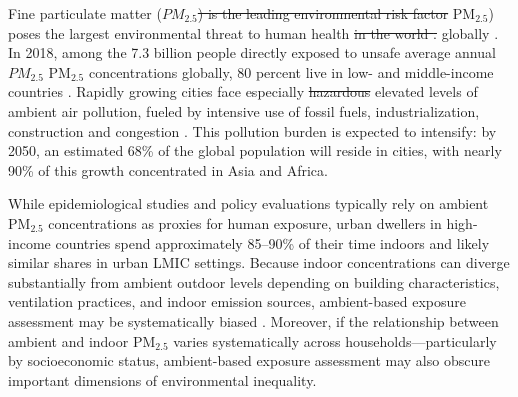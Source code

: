 \documentclass[reqno,12pt,notitlepage]{article}
\providecommand{\DIFadd}[1]{{\protect\color{BLUE}#1}} %
\providecommand{\DIFdel}[1]{{\protect\color{red}\sout{#1}}} %
\providecommand{\DIFaddbegin}{} %
\providecommand{\DIFaddend}{} %
\providecommand{\DIFdelbegin}{} %
\providecommand{\DIFdelend}{} %
\begin{document}
Fine particulate matter (\DIFdelbegin \DIFdel{$PM_{2.5}$) is the leading environmental risk factor }\DIFdelend \DIFaddbegin \DIFadd{PM$_{2.5}$) poses the largest environmental threat }\DIFaddend to human health \DIFdelbegin \DIFdel{in the world \citep{health_effects_institute_state_2024}. 
}\DIFdelend \DIFaddbegin \DIFadd{globally \citep{health_effects_institute_state_2024}. 
}\DIFaddend In 2018, among the 7.3 billion people directly exposed to unsafe average annual \DIFdelbegin \DIFdel{$PM_{2.5}$ }\DIFdelend \DIFaddbegin \DIFadd{PM$_{2.5}$ }\DIFaddend concentrations globally, 80 percent live in low- and middle-income countries \citep{rentschler_global_2023}. 
Rapidly growing cities face especially \DIFdelbegin \DIFdel{hazardous }\DIFdelend \DIFaddbegin \DIFadd{elevated }\DIFaddend levels of ambient air pollution, fueled by intensive use of fossil fuels, industrialization, construction and congestion \DIFdelbegin \DIFdel{\citep{manisalidis_environmental_2020}}\DIFdelend \DIFaddbegin \DIFadd{\citep{kim2025tracking, landrigan2018lancet}}\DIFaddend . This pollution burden is expected to intensify: by 2050, an estimated 68\% of the global population will reside in cities, with nearly 90\% of this growth concentrated in Asia and Africa. 

\DIFaddbegin \DIFadd{While epidemiological studies and policy evaluations typically rely on ambient PM$_{2.5}$ concentrations as proxies for human exposure, urban dwellers in high-income countries spend approximately 85--90\% of their time indoors \citep{klepeis_national_2001} and likely similar shares in urban LMIC settings.
Because indoor concentrations can diverge substantially from ambient outdoor levels depending on building characteristics, ventilation practices, and indoor emission sources, ambient-based exposure assessment may be systematically biased \citep{avery_estimating_2010, evangelopoulos_pm25_2020}. Moreover, if the relationship between ambient and indoor PM$_{2.5}$ varies systematically across households---particularly by socioeconomic status, ambient-based exposure assessment may also obscure important dimensions of environmental inequality. 
}
\end{document}

